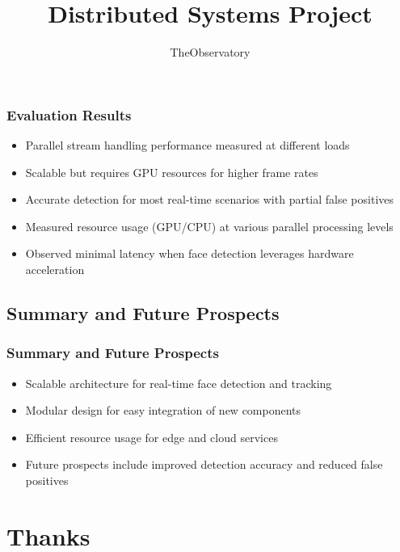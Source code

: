 \documentclass[11pt,t,usepdftitle=false,aspectratio=169]{beamer}
\begin{document}
\begin{frame}
\frametitle{Evaluation Results}
\begin{itemize}
	\item Parallel stream handling performance measured at different loads
	\item Scalable but requires GPU resources for higher frame rates
	\item Accurate detection for most real-time scenarios with partial false positives
	\item Measured resource usage (GPU/CPU) at various parallel processing levels
	\item Observed minimal latency when face detection leverages hardware acceleration
\end{itemize}
\end{frame}

\subsection{Summary and Future Prospects}
\begin{frame}
\frametitle{Summary and Future Prospects}
\begin{itemize}
	\item Scalable architecture for real-time face detection and tracking
	\item Modular design for easy integration of new components
	\item Efficient resource usage for edge and cloud services
	\item Future prospects include improved detection accuracy and reduced false positives
\end{itemize}

\end{frame}


\title[TheObservatory]{Distributed Systems Project}
\subtitle{TheObservatory}
\section{Thanks}
\end{document}
